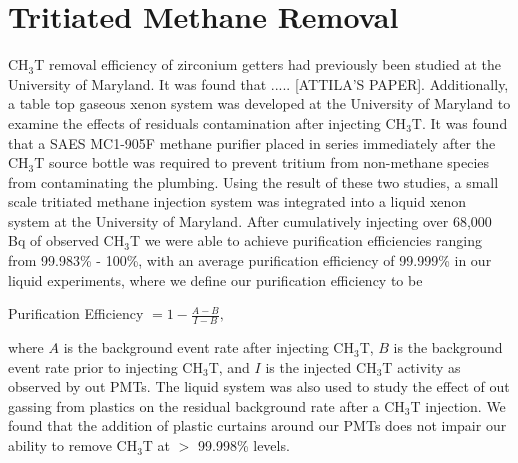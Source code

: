 \section{Tritiated Methane Removal}
\label{sec:RD}

CH$_3$T removal efficiency of zirconium getters had previously been studied at the University of Maryland.  It was found that ..... [ATTILA'S PAPER]. Additionally, a table top gaseous xenon system was developed at the University of Maryland to examine the effects of residuals contamination after injecting CH$_3$T.  It was found that a SAES MC1-905F methane purifier placed in series immediately after the CH$_3$T source bottle was required to prevent tritium from non-methane species from contaminating the plumbing. Using the result of these two studies, a small scale tritiated methane injection system was integrated into a liquid xenon system at the University of Maryland.  After cumulatively injecting over 68,000 Bq of observed CH$_3$T we were able to achieve purification efficiencies ranging from 99.983\% - 100\%, with an average purification efficiency of 99.999\% in our liquid experiments, where we define our purification efficiency to be

\begin{center}
Purification Efficiency $= 1 - \frac{A - B}{I - B},$
\end{center}

\noindent
where $A$ is the background event rate after injecting CH$_3$T, $B$ is the background event rate prior to injecting CH$_3$T, and $I$ is the injected CH$_3$T activity as observed by out PMTs.  The liquid system was also used to study the effect of out gassing from plastics on the residual background rate after a CH$_3$T injection.  We found that the addition of plastic curtains around our PMTs does not impair our ability to remove CH$_3$T at $>$ 99.998\% levels. 